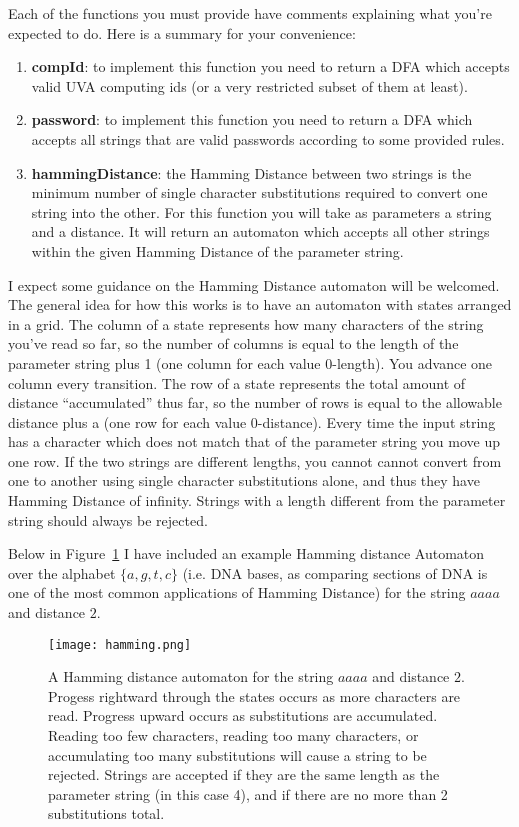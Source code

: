 \documentclass[10pt]{article}
\begin{document}
Each of the functions you must provide have comments explaining what you're expected to do. Here is a summary for your convenience:

\begin{enumerate}
    \item \textbf{compId}: to implement this function you need to return a DFA which accepts valid UVA computing ids (or a very restricted subset of them at least).
    \item \textbf{password}: to implement this function you need to return a DFA which accepts all strings that are valid passwords according to some provided rules.
    \item \textbf{hammingDistance}: the Hamming Distance between two strings is the minimum number of single character substitutions required to convert one string into the other. For this function you will take as parameters a string and a distance. It will return an automaton which accepts all other strings within the given Hamming Distance of the parameter string.
\end{enumerate}

I expect some guidance on the Hamming Distance automaton will be welcomed. The general idea for how this works is to have an automaton with states arranged in a grid. The column of a state represents how many characters of the string you've read so far, so the number of columns is equal to the length of the parameter string plus 1 (one column for each value 0-length). You advance one column every transition. The row of a state represents the total amount of distance ``accumulated'' thus far, so the number of rows is equal to the allowable distance plus a (one row for each value 0-distance). Every time the input string has a character which does not match that of the parameter string you move up one row. 
If the two strings are different lengths, you cannot cannot convert from one to another using single character substitutions alone, and thus they have Hamming Distance of infinity. Strings with a length different from the parameter string should always be rejected.

Below in Figure~\ref{fig:hamming} I have included an example Hamming distance Automaton over the alphabet $\{a,g,t,c\}$ (i.e. DNA bases, as comparing sections of DNA is one of the most common applications of Hamming Distance) for the string $aaaa$ and distance $2$.

\begin{figure}
    \centering
    \texttt{[image: hamming.png]}
    \caption{A Hamming distance automaton for the string $aaaa$ and distance $2$. Progess rightward through the states occurs as more characters are read. Progress upward occurs as substitutions are accumulated. Reading too few characters, reading too many characters, or accumulating too many substitutions will cause a string to be rejected. Strings are accepted if they are the same length as the parameter string (in this case 4), and if there are no more than 2 substitutions total.}
    \label{fig:hamming}
\end{figure}
\end{document}
